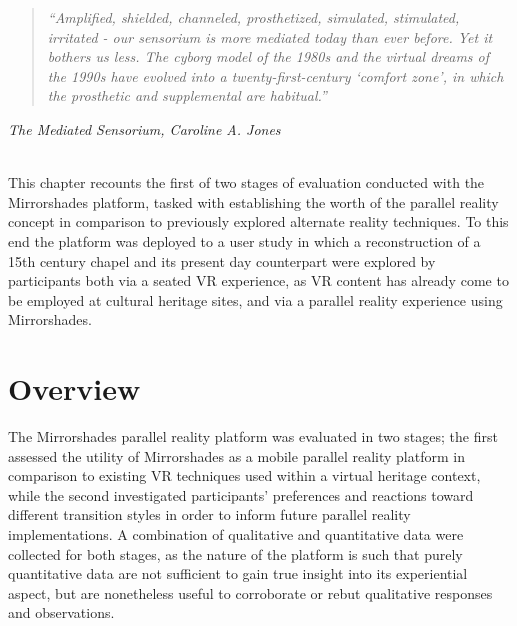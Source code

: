 \begin{quote}
	\textit{``Amplified, shielded, channeled, prosthetized, simulated, stimulated, irritated - our sensorium is more mediated today than ever before. Yet it bothers us less. The cyborg model of the 1980s and the virtual dreams of the 1990s have evolved into a twenty-first-century `comfort zone', in which the prosthetic and supplemental are habitual.''}
\end{quote}
\hfill \textit{The Mediated Sensorium, Caroline A. Jones}
\\
\\


\label{chapter-eval-1}

This chapter recounts the first of two stages of evaluation conducted with the Mirrorshades platform, tasked with establishing the worth of the parallel reality concept in comparison to previously explored alternate reality techniques. To this end the platform was deployed to a user study in which a reconstruction of a 15th century chapel and its present day counterpart were explored by participants both via a seated VR experience, as VR content has already come to be employed at cultural heritage sites, and via a parallel reality experience using Mirrorshades.




\section{Overview}

The Mirrorshades parallel reality platform was evaluated in two stages; the first assessed the utility of Mirrorshades as a mobile parallel reality platform in comparison to existing VR techniques used within a virtual heritage context, while the second investigated participants' preferences and reactions toward different transition styles in order to inform future parallel reality implementations. A combination of qualitative and quantitative data were collected for both stages, as the nature of the platform is such that purely quantitative data are not sufficient to gain true insight into its experiential aspect, but are nonetheless useful to corroborate or rebut qualitative responses and observations.

